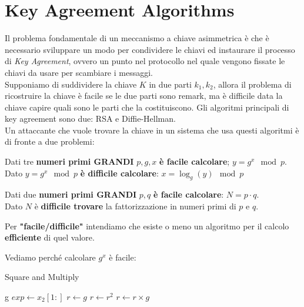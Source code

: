 \section{Key Agreement Algorithms}
Il problema fondamentale di un meccanismo a chiave asimmetrica è che è necessario sviluppare un modo per condividere le chiavi ed instaurare il processo di \textit{Key Agreement}, ovvero un punto nel protocollo nel quale vengono fissate le chiavi da usare per scambiare i messaggi.\\
Supponiamo di suddividere la chiave $K$ in due parti $k_1,k_2$, allora il problema di ricostruire la chiave è facile se le due parti sono remark, ma è difficile data la chiave capire quali sono le parti che la costituiscono. Gli algoritmi principali di key agreement sono due: RSA e Diffie-Hellman.\\
Un attaccante che vuole trovare la chiave in un sistema che usa questi algoritmi è di fronte a due problemi:
\begin{proposition}\label{prop:disclog}
Dati tre \textbf{numeri primi \textsc{GRANDI}} $p,g,x$ \textbf{è facile calcolare}; $y=g^x\mod{p}$.\\
Dato $y=g^x\mod{p}$ \textbf{è difficile calcolare}: $x=\log_g(y)\mod{p}$
\end{proposition}
\begin{proposition}\label{prop:prodfact}
Dati due \textbf{numeri primi \textsc{GRANDI}} $p,q$ \textbf{è facile calcolare}: $N=p\cdot{q}$.\\
Dato $N$ è \textbf{difficile trovare} la fattorizzazione in numeri primi di $p$ e $q$.
\end{proposition}
\begin{remark}
Per \textbf{"facile/difficile"} intendiamo che esiste o meno un algoritmo per il calcolo \textbf{efficiente} di quel valore.
\end{remark}
Vediamo perché calcolare $g^x$ è facile: 
\begin{algorithm}
\caption{Square and Multiply}\label{alg:squaremult}
\begin{algorithmic}[1]
    \Return g
\Else
\State $exp\gets x_2[1:]$
\State $r\gets g$
    \State $r\gets r^2$
       \State $r\gets r\times g$
    \EndIf  
\EndFor
\EndIf
\EndProcedure
\end{algorithmic}
\end{algorithm}\\
